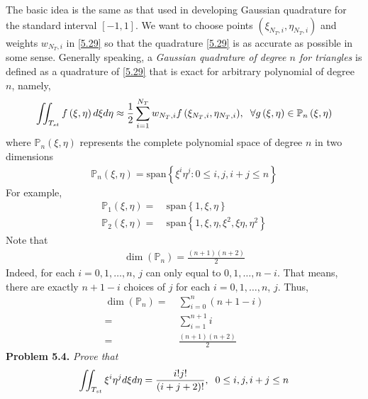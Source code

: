 \documentclass[a4paper]{article}
\numberwithin{equation}{section}
\begin{document}
The basic idea is the same as that used in developing Gaussian quadrature for the standard interval $\left[-1,1\right]$. We want to choose points $\left( {{\xi _{{N_T},i}},{\eta _{{N_T},i}}} \right)$ and weights $w_{{N_T},i}$ in \eqref{5.29} so that the quadrature \eqref{5.29} is as accurate as possible in some sense. Generally speaking, a \textit{Gaussian quadrature of degree $n$ for triangles} is defined as a quadrature of \eqref{5.29} that is exact for arbitrary polynomial of degree $n$, namely,
\begin{align}
\iint_{{T_{st}}} {f\left( {\xi ,\eta } \right)d\xi d\eta } \approx \frac{1}{2}\sum\limits_{i = 1}^{{N_T}} {{w_{{N_T},i}}f\left( {{\xi _{{N_T},i}},{\eta _{{N_T},i}}} \right)} ,\hspace{0.2cm}\forall g\left( {\xi ,\eta } \right) \in {\mathbb{P}_n}\left( {\xi ,\eta } \right)
\end{align}
where ${\mathbb{P}_n}\left( {\xi ,\eta } \right)$ represents the complete polynomial space of degree $n$ in two dimensions
\begin{align}
{\mathbb{P}_n}\left( {\xi ,\eta } \right) = \mbox{span}\left\{ {{\xi ^i}{\eta ^j}:0 \leqslant i,j,i + j \leqslant n} \right\}
\end{align}
For example,
\begin{align}
{\mathbb{P}_1}\left( {\xi ,\eta } \right) =&\ \mbox{span}\left\{ {1,\xi ,\eta } \right\}\\
{\mathbb{P}_2}\left( {\xi ,\eta } \right) =&\ \mbox{span}\left\{ {1,\xi ,\eta ,{\xi ^2},\xi \eta ,{\eta ^2}} \right\}
\end{align}
Note that 
\begin{align}
\dim \left( {{\mathbb{P}_n}} \right) = \frac{{\left( {n + 1} \right)\left( {n + 2} \right)}}{2}
\end{align}
Indeed, for each $i=0,1,\ldots,n$, $j$ can only equal to $0,1,\ldots,n-i$. That means, there are exactly $n+1-i$ choices of $j$ for each $i=0,1,\ldots,n$, $j$. Thus,
\begin{align}
\dim \left( {{\mathbb{P}_n}} \right)=&\ \sum\limits_{i = 0}^n {\left( {n + 1 - i} \right)} \\
 =&\ \sum\limits_{i = 1}^{n + 1} i \\
=&\ \frac{{\left( {n + 1} \right)\left( {n + 2} \right)}}{2}
\end{align}
\textbf{Problem 5.4.} \textit{Prove that}
\begin{align}
\label{5.38}
\iint_{{T_{st}}} {{\xi ^i}{\eta ^j}d\xi d\eta } = \frac{{i!j!}}{{\left( {i + j + 2} \right)!}},\hspace{0.2cm}0 \le i,j,i + j \le n
\end{align}
\end{document}
